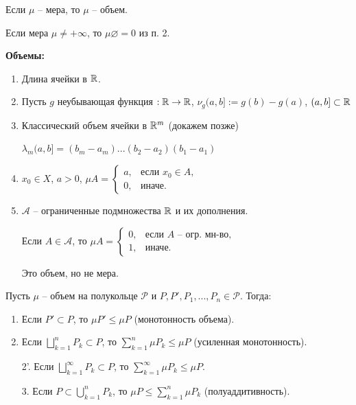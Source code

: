 \begin{remark} 
    Если $\mu$ – мера, то $\mu$ – объем.
\end{remark}

\begin{exercise}
    Если мера $\mu \not = +\infty$, то $\mu \varnothing = 0$ из п. 2.
\end{exercise}

\begin{example}
    \textbf{Объемы:}

    \begin{enumerate}
        \item Длина ячейки в $\mathbb{R}$.
        \item Пусть $g$ неубывающая функция $:\mathbb{R}\rightarrow \mathbb{R}$, $\nu_g(a, b]:=g(b)- g(a)$, $(a, b]\subset \mathbb{R}$
        \item Классический объем ячейки в $\mathbb{R}^m$ (докажем позже)
        
        $\lambda_m(a, b] = (b_m - a_m)...(b_2 - a_2)(b_1 - a_1)$
        \item $x_0\in X$, $a>0$, $\mu A =\left\{\begin{array}{ll}
            a, & \text{если } x_0\in A,  \\
            0, & \text{иначе.}
       \end{array}\right.$
        \item $\mathcal{A}$ – ограниченные подмножества $\mathbb{R}$ и их дополнения. 
        
        Если $A\in \mathcal{A}$, то $\mu A=\left\{\begin{array}{ll}
            0, & \text{если } A \text{ – огр. мн-во,}  \\
            1, & \text{иначе.} 
        \end{array}\right.$

        Это объем, но не мера.
    \end{enumerate}
\end{example}

\begin{theorem}
    Пусть $\mu$ – объем на полукольце $\mathcal{P}$ и $P, P', P_1, ..., P_n \in \mathcal{P}$. Тогда:

    \begin{enumerate}
        \item Если $P'\subset P$, то $\mu P' \leq \mu P$ (монотонность объема).
        \item Если $\bigsqcup\limits_{k=1}^n P_k\subset P$, то $\sum\limits_{k=1}^n \mu P_k \leq \mu P$ (усиленная монотонность).
        \item[2'.] Если $\bigsqcup\limits_{k=1}^\infty P_k\subset P$, то $\sum\limits_{k=1}^\infty \mu P_k \leq \mu P$.
        \item[3.] Если $P\subset \bigcup\limits_{k=1}^n P_k$, то $\mu P \leq \sum\limits_{k=1}^n \mu P_k$ (полуаддитивность).
    \end{enumerate}
\end{theorem}


